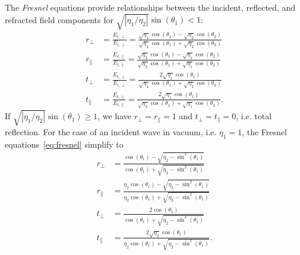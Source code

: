 The \emph{Fresnel} equations provide relationships between the incident, reflected, and refracted field components for $\sqrt{\left| \eta_1/\eta_2 \right|}\sin(\theta_1)<1$:
\begin{equation}
    \label{eq:fresnel}
    \begin{aligned}
        r_{\perp}     &= \frac{E_{\text{r}, \perp    }}{E_{\text{i}, \perp    }} = \frac{ \sqrt{\eta_1}\cos(\theta_1) - \sqrt{\eta_2}\cos(\theta_2) }{ \sqrt{\eta_1}\cos(\theta_1) + \sqrt{\eta_2}\cos(\theta_2) } \\
        r_{\parallel} &= \frac{E_{\text{r}, \parallel}}{E_{\text{i}, \parallel}} = \frac{ \sqrt{\eta_2}\cos(\theta_1) - \sqrt{\eta_1}\cos(\theta_2) }{ \sqrt{\eta_2}\cos(\theta_1) + \sqrt{\eta_1}\cos(\theta_2) } \\
        t_{\perp}     &= \frac{E_{\text{t}, \perp    }}{E_{\text{i}, \perp    }} = \frac{ 2\sqrt{\eta_1}\cos(\theta_1) }{ \sqrt{\eta_1}\cos(\theta_1) + \sqrt{\eta_2}\cos(\theta_2) } \\
        t_{\parallel} &= \frac{E_{\text{t}, \parallel}}{E_{\text{i}, \parallel}} = \frac{ 2\sqrt{\eta_1}\cos(\theta_1) }{ \sqrt{\eta_2}\cos(\theta_1) + \sqrt{\eta_1}\cos(\theta_2) }.
    \end{aligned}
\end{equation}
If $\sqrt{\left| \eta_1/\eta_2 \right|}\sin(\theta_1)\ge 1$, we have $r_{\perp}=r_{\parallel}=1$ and $t_{\perp}=t_{\parallel}=0$, i.e. total reflection.
For the case of an incident wave in vacuum, i.e. $\eta_1=1$, the Fresnel equations~\eqref{eq:fresnel} simplify to
\begin{equation}
    \label{eq:fresnel_vac}
    \begin{aligned}
        r_{\perp}     &= \frac{\cos(\theta_1) -\sqrt{\eta_2 -\sin^2(\theta_1)}}{\cos(\theta_1) +\sqrt{\eta_2 -\sin^2(\theta_1)}} \\
        r_{\parallel} &= \frac{\eta_2\cos(\theta_1) -\sqrt{\eta_2 -\sin^2(\theta_1)}}{\eta_2\cos(\theta_1) +\sqrt{\eta_2 -\sin^2(\theta_1)}} \\
        t_{\perp}     &= \frac{2\cos(\theta_1)}{\cos(\theta_1) + \sqrt{\eta_2-\sin^2(\theta_1)}}\\
        t_{\parallel} &= \frac{2\sqrt{\eta_2}\cos(\theta_1)}{\eta_2 \cos(\theta_1) + \sqrt{\eta_2-\sin^2(\theta_1)}}.
    \end{aligned}
\end{equation}


